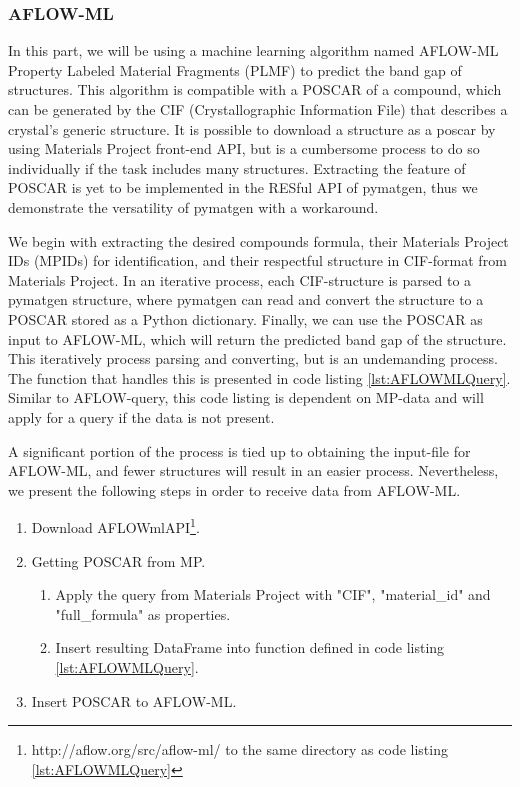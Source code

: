 \subsubsection{AFLOW-ML}

In this part, we will be using a machine learning algorithm named AFLOW-ML Property Labeled Material Fragments (PLMF) \cite{Isayev2017} to predict the band gap of structures. This algorithm is compatible with a POSCAR of a compound, which can be generated by the CIF (Crystallographic Information File) that describes a crystal's generic structure. It is possible to download a structure as a poscar by using Materials Project front-end API, but is a cumbersome process to do so individually if the task includes many structures. Extracting the feature of POSCAR is yet to be implemented in the RESful API of pymatgen, thus we demonstrate the versatility of pymatgen with a workaround.

We begin with extracting the desired compounds formula, their Materials Project IDs (MPIDs) for identification, and their respectful structure in CIF-format from Materials Project. In an iterative process, each CIF-structure is parsed to a pymatgen structure, where pymatgen can read and convert the structure to a POSCAR stored as a Python dictionary. Finally, we can use the POSCAR as input to AFLOW-ML, which will return the predicted band gap of the structure. This iteratively process parsing and converting, but is an undemanding process. The function that handles this is presented in code listing \autoref{lst:AFLOWMLQuery}. Similar to AFLOW-query, this code listing is dependent on MP-data and will apply for a query if the data is not present.

A significant portion of the process is tied up to obtaining the input-file for AFLOW-ML, and fewer structures will result in an easier process. Nevertheless, we present the following steps in order to receive data from AFLOW-ML.

\begin{enumerate}
  \item Download AFLOWmlAPI\footnote{http://aflow.org/src/aflow-ml/ to the same directory as code listing \autoref{lst:AFLOWMLQuery}}.
  \item Getting POSCAR from MP.
  \begin{enumerate}
    \item Apply the query from Materials Project with "CIF", "material\_id" and "full\_formula" as properties.
    \item Insert resulting DataFrame into function defined in code listing \autoref{lst:AFLOWMLQuery}.
  \end{enumerate}
    \item Insert POSCAR to AFLOW-ML.
\end{enumerate}


